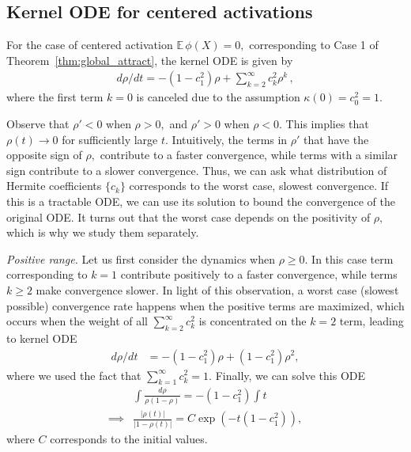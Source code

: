 \documentclass[twoside]{article}
\newcommand{\E}{\mathbb{E}\,}
\theoremstyle{definition}
\newcommand{\thomas}[1]{{\color{blue}TH:  \textit{#1}}}
\begin{document}
\subsection{Kernel ODE for centered activations}
For the case of centered activation $\E \phi(X)=0,$ corresponding to Case 1 of Theorem~\ref{thm:global_attract}, the kernel ODE is given by
\begin{align*}
    d\rho/dt = -(1-c_1^2)\rho + \sum_{k=2}^\infty c_k^2\rho^k\,,
\end{align*}
where the first term $k=0$ is canceled due to the assumption $\kappa(0)=c_0^2 = 1.$ 

Observe that $\rho'<0$ when $\rho>0,$ and $\rho'>0$ when $\rho<0.$ This implies that $\rho(t) \to 0$ for sufficiently large $t.$ Intuitively, the terms in $\rho'$ that have the opposite sign of $\rho,$ contribute to a faster convergence, while terms with a similar sign contribute to a slower convergence. Thus, we can ask what distribution of Hermite coefficients $\{c_k\}$ corresponds to the worst case, slowest convergence. If this is a tractable ODE, we can use its solution to bound the convergence of the original ODE. It turns out that the worst case depends on the positivity of $\rho,$ which is why we study them separately.

\textit{Positive range.}
Let us first consider the dynamics when $\rho\ge 0.$ 
In this case term corresponding to $k=1$ contribute positively to a faster convergence, while terms $k\ge 2$ make convergence slower. In light of this observation, a worst case (slowest possible) convergence rate happens when the positive terms are maximized, which occurs when the weight of all $\sum_{k=2}^\infty c_k^2 $ is concentrated on the $k=2$ term, leading to kernel ODE
\begin{align*}
    d\rho/dt &=  -(1-c_1^2)\rho + (1-c_1^2) \rho^2,
\end{align*}
where we used the fact that $\sum_{k=1}^\infty c_k^2 = 1.$ 
Finally, we can solve this ODE 
\begin{align*}
    &\int \frac{d\rho}{\rho(1-\rho)} = - (1-c_1^2)\int t \\
    \implies &\frac{|\rho(t)|}{|1-\rho(t)|} = C \exp(-t(1-c_1^2)),
\end{align*}
where $C$ corresponds to the initial values. 
\end{document}
